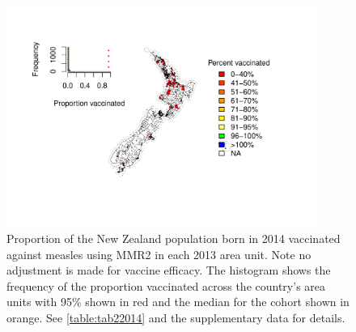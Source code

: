 \documentclass{article}
\begin{document}
\begin{figure}
\begin{center}
    \includegraphics[width=0.9\textwidth]{nir_census_MMR2_NIR_2014.pdf}
 \end{center}
\caption{Proportion of the New Zealand population born in 2014 vaccinated against measles using MMR2 in each 2013 area unit. Note no adjustment is made for vaccine efficacy. The histogram shows the frequency of the proportion vaccinated across the country's area units with 95\% shown in red and the median for the cohort shown in orange. See \autoref{table:tab22014} and the supplementary data for details.}
\label{fig:fig22014}
\end{figure}
\end{document}
